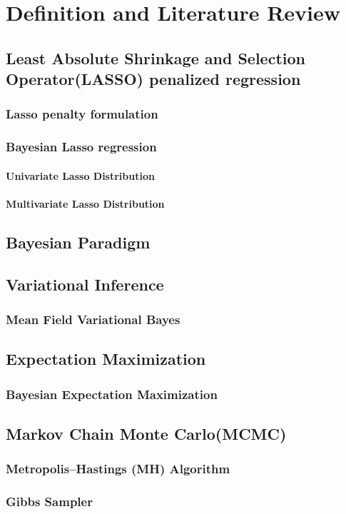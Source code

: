 \chapter{Definition and Literature Review}
\label{Chapter2}
\section{Least Absolute Shrinkage and Selection Operator(LASSO) penalized regression}
\subsection{Lasso penalty formulation}
\subsection{Bayesian Lasso regression}
\subsubsection{Univariate Lasso Distribution}
\subsubsection{Multivariate Lasso Distribution}

\section{Bayesian Paradigm}
\section{Variational Inference}
\subsection{Mean Field Variational Bayes}

\section{Expectation Maximization}
\subsection{Bayesian Expectation Maximization}

\section{Markov Chain Monte Carlo(MCMC)}
\subsection{Metropolis–Hastings (MH) Algorithm}
\subsection{Gibbs Sampler}







